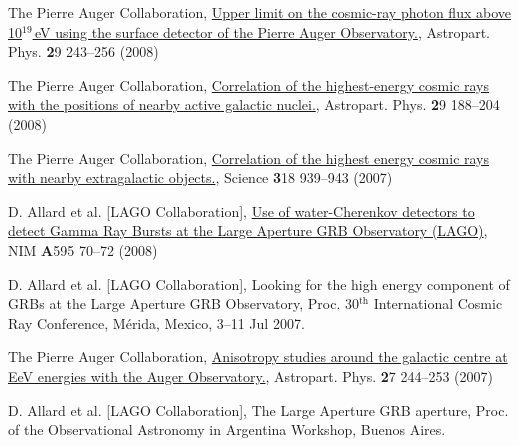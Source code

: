 \begin{etaremune}
\item {}The Pierre Auger Collaboration,
\href{http://dx.doi.org/10.1016/j.astropartphys.2008.01.003}{{Upper limit
on the cosmic-ray photon flux above 10$^{19}$\,eV using the surface detector of
the Pierre Auger Observatory.}}, Astropart.
Phys. {\textbf 29} 243--256 (2008)

\item {}The Pierre Auger Collaboration,
\href{http://dx.doi.org/10.1016/j.astropartphys.2008.01.002}{{Correlation
of the highest-energy cosmic rays with the positions of nearby active galactic
nuclei.}}, Astropart.
Phys. {\textbf 29} 188--204 (2008)

\item {}The Pierre Auger Collaboration,
\href{http://dx.doi.org/10.1126/science.1151124}{{Correlation of the
highest energy cosmic rays with nearby extragalactic objects.}}, Science {\textbf
318} 939--943 (2007)

\item {}D. Allard { et al.} [LAGO Collaboration],
\href{http://dx.doi.org/10.1016/j.nima.2008.07.041}{{Use of
water-Cherenkov detectors to detect Gamma Ray Bursts at the Large Aperture GRB
Observatory (LAGO)}}, NIM {\textbf A595} 70--72 (2008)

\item {}D. Allard { et al.} [LAGO Collaboration], {{Looking for
the high energy component of GRBs at the Large Aperture GRB Observatory}}, \en
Proc.
30$^{\mathrm{th}}$ International Cosmic Ray Conference,  Mérida, Mexico, 3--11 Jul
2007.

\item {}The Pierre Auger Collaboration,
\href{http://dx.doi.org/10.1016/j.astropartphys.2006.11.002}{{Anisotropy
studies around the galactic centre at EeV energies with the Auger
Observatory.}},  Astropart.
Phys. {\textbf 27} 244--253 (2007)

\item {}D. Allard { et al.} [LAGO Collaboration], {{The Large
Aperture GRB aperture}}, \en Proc.
of the Observational Astronomy in Argentina
Workshop, Buenos Aires.

\end{etaremune}